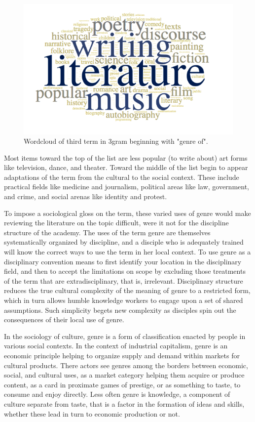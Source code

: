 \documentclass[]{book}
\theoremstyle{definition}
\theoremstyle{definition}
\theoremstyle{definition}
\theoremstyle{remark}
\begin{document}
\begin{figure}

{\centering \includegraphics[width=0.9\linewidth]{img/genre-goog} 

}

\caption{Wordcloud of third term in 3gram beginning with "genre of".}\label{fig:genre-goog}
\end{figure}

Most items toward the top of the list are less popular (to write about)
art forms like television, dance, and theater. Toward the middle of the
list begin to appear adaptations of the term from the cultural to the
social context. These include practical fields like medicine and
journalism, political areas like law, government, and crime, and social
arenas like identity and protest.

To impose a sociological gloss on the term, these varied uses of genre
would make reviewing the literature on the topic difficult, were it not
for the discipline structure of the academy. The uses of the term genre
are themselves systematically organized by discipline, and a disciple
who is adequately trained will know the correct ways to use the term in
her local context. To use genre as a disciplinary convention means to
first identify your location in the disciplinary field, and then to
accept the limitations on scope by excluding those treatments of the
term that are extradisciplinary, that is, irrelevant. Disciplinary
structure reduces the true cultural complexity of the meaning of genre
to a restricted form, which in turn allows humble knowledge workers to
engage upon a set of shared assumptions. Such simplicity begets new
complexity as disciples spin out the consequences of their local use of
genre.

In the sociology of culture, genre is a form of classification enacted
by people in various social contexts. In the context of industrial
capitalism, genre is an economic principle helping to organize supply
and demand within markets for cultural products. There actors see genres
among the borders between economic, social, and cultural uses, as a
market category helping them acquire or produce content, as a card in
proximate games of prestige, or as something to taste, to consume and
enjoy directly. Less often genre is knowledge, a component of culture
separate from taste, that is a factor in the formation of ideas and
skills, whether these lead in turn to economic production or not.
\end{document}
